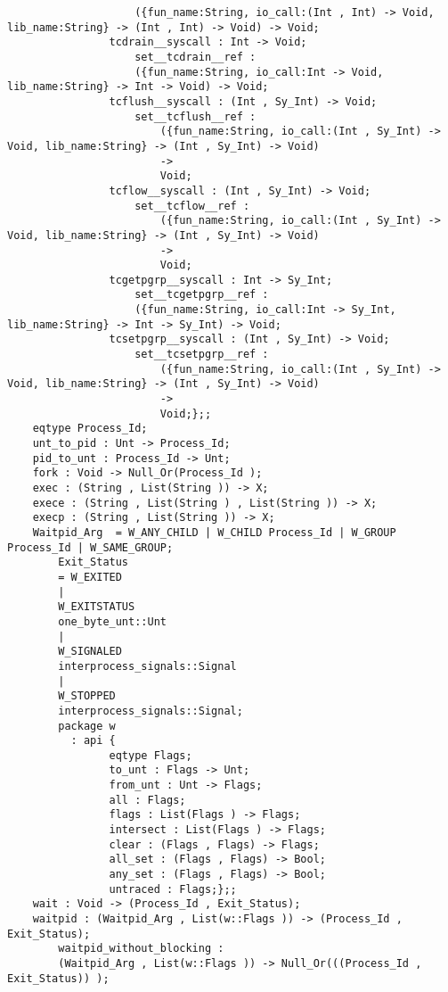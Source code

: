 \begin{verbatim}
                    ({fun_name:String, io_call:(Int , Int) -> Void, lib_name:String} -> (Int , Int) -> Void) -> Void;
                tcdrain__syscall : Int -> Void;
                    set__tcdrain__ref :
                    ({fun_name:String, io_call:Int -> Void, lib_name:String} -> Int -> Void) -> Void;
                tcflush__syscall : (Int , Sy_Int) -> Void;
                    set__tcflush__ref :
                        ({fun_name:String, io_call:(Int , Sy_Int) -> Void, lib_name:String} -> (Int , Sy_Int) -> Void)
                        ->
                        Void;
                tcflow__syscall : (Int , Sy_Int) -> Void;
                    set__tcflow__ref :
                        ({fun_name:String, io_call:(Int , Sy_Int) -> Void, lib_name:String} -> (Int , Sy_Int) -> Void)
                        ->
                        Void;
                tcgetpgrp__syscall : Int -> Sy_Int;
                    set__tcgetpgrp__ref :
                    ({fun_name:String, io_call:Int -> Sy_Int, lib_name:String} -> Int -> Sy_Int) -> Void;
                tcsetpgrp__syscall : (Int , Sy_Int) -> Void;
                    set__tcsetpgrp__ref :
                        ({fun_name:String, io_call:(Int , Sy_Int) -> Void, lib_name:String} -> (Int , Sy_Int) -> Void)
                        ->
                        Void;};;
    eqtype Process_Id;
    unt_to_pid : Unt -> Process_Id;
    pid_to_unt : Process_Id -> Unt;
    fork : Void -> Null_Or(Process_Id );
    exec : (String , List(String )) -> X;
    exece : (String , List(String ) , List(String )) -> X;
    execp : (String , List(String )) -> X;
    Waitpid_Arg  = W_ANY_CHILD | W_CHILD Process_Id | W_GROUP Process_Id | W_SAME_GROUP;
        Exit_Status
        = W_EXITED
        |
        W_EXITSTATUS
        one_byte_unt::Unt
        |
        W_SIGNALED
        interprocess_signals::Signal
        |
        W_STOPPED
        interprocess_signals::Signal;
        package w
          : api {
                eqtype Flags;
                to_unt : Flags -> Unt;
                from_unt : Unt -> Flags;
                all : Flags;
                flags : List(Flags ) -> Flags;
                intersect : List(Flags ) -> Flags;
                clear : (Flags , Flags) -> Flags;
                all_set : (Flags , Flags) -> Bool;
                any_set : (Flags , Flags) -> Bool;
                untraced : Flags;};;
    wait : Void -> (Process_Id , Exit_Status);
    waitpid : (Waitpid_Arg , List(w::Flags )) -> (Process_Id , Exit_Status);
        waitpid_without_blocking :
        (Waitpid_Arg , List(w::Flags )) -> Null_Or(((Process_Id , Exit_Status)) );

\end{verbatim}
